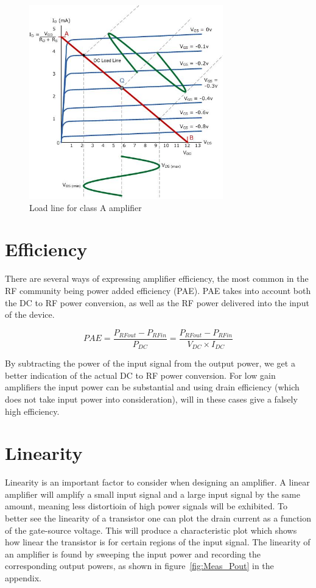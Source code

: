 \begin{figure}[h]
	  \centering
	  \includegraphics[width=0.75\textwidth]{img/Load_line_graphics}
	  \caption{Load line for class A amplifier}
	  \label{fig:fig_Load_line}
\end{figure}

\section{Efficiency}
There are several ways of expressing amplifier efficiency, the most common in the RF community being power added efficiency (PAE). PAE takes into account both the DC to RF power conversion, as well as the RF power delivered into the input of the device.

\begin{equation}
	PAE=\frac{P_{RFout}-P_{RFin}}{P_{DC}}=\frac{P_{RFout}-P_{RFin}}{V_{DC} \times I_{DC}} 
\end{equation}

By subtracting the power of the input signal from the output power, we get a better indication of the actual DC to RF power conversion. For low gain amplifiers the input power can be substantial and using drain efficiency (which does not take input power into consideration), will in these cases give a falsely high efficiency.

\section{Linearity}

Linearity is an important factor to consider when designing an amplifier. A linear amplifier will amplify a small input signal and a large input signal by the same amount, meaning less distortioin of high power signals will be exhibited. To better see the linearity of a transistor one can plot the drain current as a function of the gate-source voltage. This will produce a characteristic plot which shows how linear the transistor is for certain regions of the input signal. The linearity of an amplifier is found by sweeping the input power and recording the corresponding output powers, as shown in figure~\ref{fig:Meas_Pout} in the appendix.

